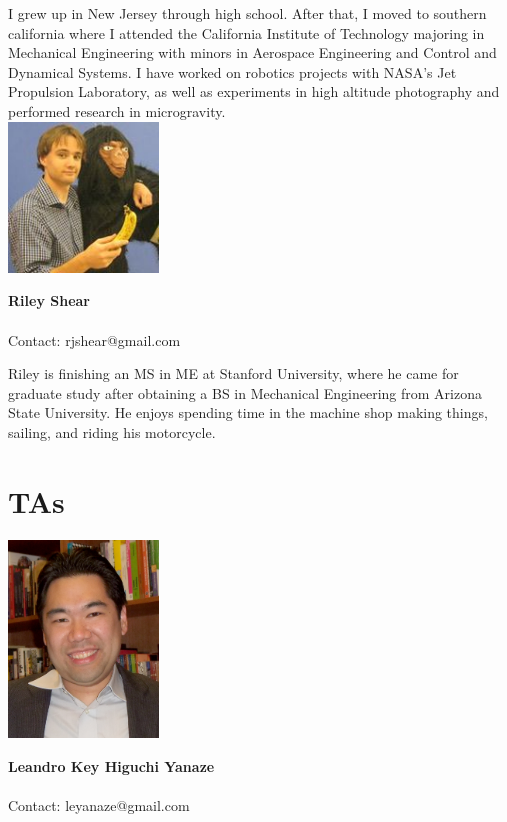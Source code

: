 I grew up in New Jersey through high school. After that, I moved to southern california where I attended the California Institute of Technology majoring in Mechanical Engineering with minors in Aerospace Engineering and Control and Dynamical Systems. I have worked on robotics projects with NASA’s Jet Propulsion Laboratory, as well as experiments in high altitude photography and performed research in microgravity.
\\

\noindent \includegraphics[width=40mm]{images/riley.jpg}
\parbox[b]{0.6\textwidth}{\textbf{Riley Shear}\\ \\
Contact: rjshear@gmail.com
}

Riley is finishing an MS in ME at Stanford University, where he came for graduate study after obtaining a BS in Mechanical Engineering from Arizona State University. He enjoys spending time in the machine shop making things, sailing, and riding his motorcycle.

\section{TAs}
\noindent \includegraphics[width=40mm]{images/foto_leandro.jpg}
\parbox[b]{0.6\textwidth}{\textbf{Leandro Key Higuchi Yanaze}\\ \\
Contact: leyanaze@gmail.com
}

